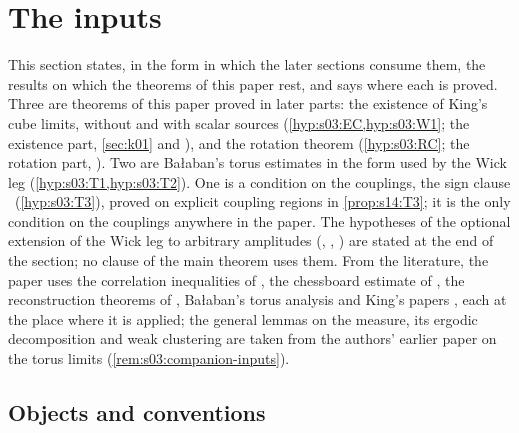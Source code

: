 \section{The inputs}\label{sec:s03}

This section states, in the form in which the later sections consume them, the results on which the theorems of this paper rest, and says where each is proved. Three are theorems of this paper proved in later parts: the existence of King's cube limits, without and with scalar sources (\cref{hyp:s03:EC,hyp:s03:W1}; the existence part, \cref{sec:k01} and ), and the rotation theorem (\cref{hyp:s03:RC}; the rotation part, ). Two are Ba{\l}aban's torus estimates in the form used by the Wick leg (\cref{hyp:s03:T1,hyp:s03:T2}). One is a condition on the couplings, the sign clause \Tthree\ (\cref{hyp:s03:T3}), proved on explicit coupling regions in \cref{prop:s14:T3}; it is the only condition on the couplings anywhere in the paper. The hypotheses of the optional extension of the Wick leg to arbitrary amplitudes (\Wtwo, \RW, \FAK) are stated at the end of the section; no clause of the main theorem uses them. From the literature, the paper uses the correlation inequalities of \cite{BFS1}, the chessboard estimate of \cite{FILS78}, the reconstruction theorems of \cite{OS73,OS75}, Ba{\l}aban's torus analysis \cite{Ba1,Ba2,Ba3,Ba4} and King's papers \cite{K1,K2}, each at the place where it is applied; the general lemmas on the measure, its ergodic decomposition and weak clustering are taken from the authors' earlier paper on the torus limits \cite{SymPhase} (\cref{rem:s03:companion-inputs}).

\subsection{Objects and conventions}


